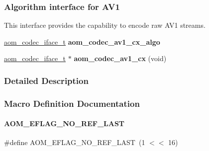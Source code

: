 \subsubsection*{Algorithm interface for A\+V1}
\label{_amgrp8c574bd9a585a04008b0d15257056884}%
This interface provides the capability to encode raw A\+V1 streams. \begin{DoxyCompactItemize}
\item 
\mbox{\label{group__aom__encoder_ga18350b1c0642494e2b1a970104b2e8b9}} 
\hyperlink{group__codec_ga4ef55b44c762836d1550e11921bed403}{aom\+\_\+codec\+\_\+iface\+\_\+t} {\bfseries aom\+\_\+codec\+\_\+av1\+\_\+cx\+\_\+algo}
\item 
\mbox{\label{group__aom__encoder_ga5b742eec203f55a95cc404f41c0166d8}} 
\hyperlink{group__codec_ga4ef55b44c762836d1550e11921bed403}{aom\+\_\+codec\+\_\+iface\+\_\+t} $\ast$ {\bfseries aom\+\_\+codec\+\_\+av1\+\_\+cx} (void)
\end{DoxyCompactItemize}


\subsubsection{Detailed Description}


\subsubsection{Macro Definition Documentation}
\mbox{\label{group__aom__encoder_gae272ed6e69ae2a12993565e8176d004b}} 
\paragraph{\texorpdfstring{A\+O\+M\+\_\+\+E\+F\+L\+A\+G\+\_\+\+N\+O\+\_\+\+R\+E\+F\+\_\+\+L\+A\+ST}{AOM\_EFLAG\_NO\_REF\_LAST}}
{\footnotesize\ttfamily \#define A\+O\+M\+\_\+\+E\+F\+L\+A\+G\+\_\+\+N\+O\+\_\+\+R\+E\+F\+\_\+\+L\+A\+ST~(1 $<$$<$ 16)}




